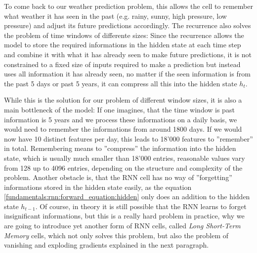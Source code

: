 To come back to our weather prediction problem, this allows the cell to remember what weather it has seen in the past (e.g. rainy, sunny, high pressure, low pressure) and adjust its future predictions accordingly. The recurrence also solves the problem of time windows of differente sizes: Since the recurrence allows the model to store the required informations in the hidden state at each time step and combine it with what it has already seen to make future predictions, it is not constrained to a fixed size of inputs required to make a prediction but instead uses all information it has already seen, no matter if the seen information is from the past 5 days or past 5 years, it can compress all this into the hidden state $h_t$.

While this is the solution for our problem of different window sizes, it is also a main bottleneck of the model: If one imagines, that the time window is past information is 5 years and we process these informations on a daily basis, we would need to remember the informations from around 1800 days. If we would now have 10 distinct features per day, this leads to 18'000 features to ''remember'' in total. Remembering means to ''compress'' the information into the hidden state, which is usually much smaller than 18'000 entries, reasonable values vary from 128 up to 4096 entries, depending on the structure and complexity of the problem. Another obstacle is, that the RNN cell has no way of ''forgetting'' informations stored in the hidden state easily, as the equation \ref{fundamentals:rnn:forward_equation:hidden} only does an addition to the hidden state $h_{t-1}$. Of course, in theory it is still possible that the RNN learns to forget insignificant informations, but this is a really hard problem in practice, why we are going to introduce yet another form of RNN cells, called \emph{Long Short-Term Memory} cells, which not only solves this problem, but also the problem of vanishing and exploding gradients explained in the next paragraph.

